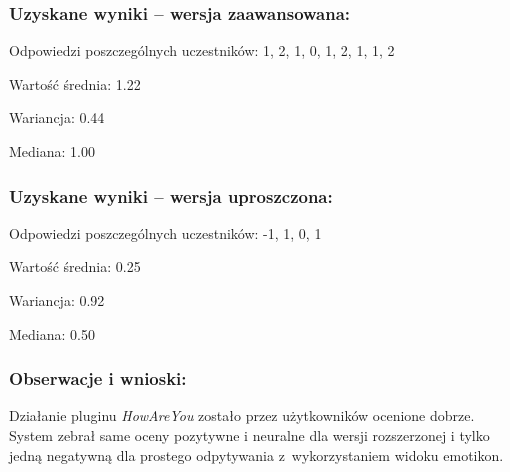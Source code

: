	\subsubsection{Uzyskane wyniki -- wersja zaawansowana:}
	
	Odpowiedzi poszczególnych uczestników: 1, 2, 1, 0, 1, 2, 1, 1, 2
	
	Wartość średnia: 1.22
	
	Wariancja: 0.44
	
	Mediana: 1.00
	
	\subsubsection{Uzyskane wyniki -- wersja uproszczona:}
	
	Odpowiedzi poszczególnych uczestników: -1, 1, 0, 1
	
	Wartość średnia: 0.25
	
	Wariancja: 0.92
	
	Mediana: 0.50
	
	\subsubsection{Obserwacje i wnioski:}
	
	Działanie pluginu \textit{HowAreYou} zostało przez użytkowników ocenione dobrze. System zebrał same oceny pozytywne i neuralne dla wersji rozszerzonej i tylko jedną negatywną dla prostego odpytywania z~wykorzystaniem widoku emotikon.
	
	
